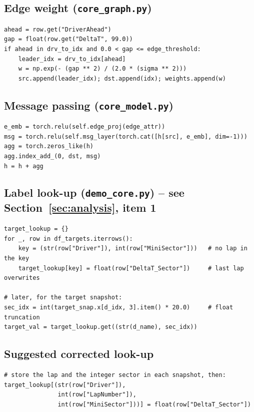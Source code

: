 \documentclass[11pt,a4paper]{article}
\begin{document}
\subsection*{Edge weight (\texttt{core\_graph.py})}
\begin{lstlisting}
ahead = row.get("DriverAhead")
gap = float(row.get("DeltaT", 99.0))
if ahead in drv_to_idx and 0.0 < gap <= edge_threshold:
    leader_idx = drv_to_idx[ahead]
    w = np.exp(- (gap ** 2) / (2.0 * (sigma ** 2)))
    src.append(leader_idx); dst.append(idx); weights.append(w)
\end{lstlisting}

\subsection*{Message passing (\texttt{core\_model.py})}
\begin{lstlisting}
e_emb = torch.relu(self.edge_proj(edge_attr))
msg = torch.relu(self.msg_layer(torch.cat([h[src], e_emb], dim=-1)))
agg = torch.zeros_like(h)
agg.index_add_(0, dst, msg)
h = h + agg
\end{lstlisting}

\subsection*{Label look-up (\texttt{demo\_core.py}) -- see Section~\ref{sec:analysis}, item 1}
\begin{lstlisting}
target_lookup = {}
for _, row in df_targets.iterrows():
    key = (str(row["Driver"]), int(row["MiniSector"]))   # no lap in the key
    target_lookup[key] = float(row["DeltaT_Sector"])     # last lap overwrites

# later, for the target snapshot:
sec_idx = int(target_snap.x[d_idx, 3].item() * 20.0)     # float truncation
target_val = target_lookup.get((str(d_name), sec_idx))
\end{lstlisting}

\subsection*{Suggested corrected look-up}
\begin{lstlisting}
# store the lap and the integer sector in each snapshot, then:
target_lookup[(str(row["Driver"]),
               int(row["LapNumber"]),
               int(row["MiniSector"]))] = float(row["DeltaT_Sector"])
\end{lstlisting}
\end{document}
